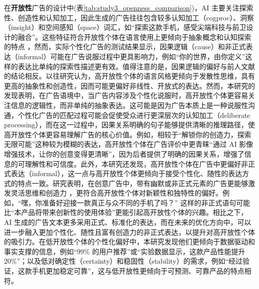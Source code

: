 在\textbf{开放性}广告的设计中(表\ref{tab:study3_openness_comparison})，AI 主要关注探索性、创造性和认知加工，因此生成的广告往往包含较多认知加工（cogproc）、洞察（insight）和空间感知（space）词汇，如“探索这款手机，感受尖端科技与前卫设计的融合”。这些特征符合开放性个体在语言使用上更倾向于抽象概念和认知探索的特点 \citep{deyoung2014openness}，然而，实际个性化广告的测试结果显示，因果逻辑（cause）和非正式表达（informal）可能在广告说服过程中更具影响力，例如“你的世界，由你定义”这样的表达比单纯的探索性描述更有效。值得注意的是，因果逻辑的偏好与前人文献的结论相反\citep{pennebaker1999linguistic}。以往研究认为，高开放性个体的语言风格更倾向于发散性思维，具有更高的抽象性和创造性，因而可能更偏好非线性、开放式的表达。然而，本研究的发现表明，在广告语境中，当广告内容涉及个性化说服时，高开放性个体更容易关注信息的逻辑性，而非单纯的抽象表达。这可能是因为广告本质上是一种说服性沟通，个性化广告的匹配过程可能会促使受众进行更深层次的认知加工（deliberate processing），而在这一过程中，因果关系明确的句子能够提供清晰的推理路径，使高开放性个体更容易理解广告的核心价值。例如，相较于“解锁你的创造力，探索无限可能”这种较为模糊的表达，高开放性个体在广告评价中更青睐“通过 AI 影像增强技术，让你的创意变得更清晰”，因为后者提供了明确的因果关系，增强了信息的可理解性和可信度。此外，本研究还发现，高开放性个体在广告中更偏好非正式表达（informal），这一点与高开放性个体更倾向于接受个性化、随性的表达方式的特点一致。研究表明，在创意广告中，带有幽默或非正式元素的广告更能够激发灵活思维和创造力 \citep{kover1995creativity}，更符合高开放性个体对新颖性和独特性的偏好。例如，“嘿，你准备好迎接一款真正与众不同的手机了吗？” 这样的非正式语句可能比“本产品将带来创新性的使用体验”更能引起高开放性个体的兴趣。相比之下，AI 生成的广告文本更多采用正式、标准化的表达，而在未来的优化方向中，可以进一步融入更加个性化、随性且富有创造力的非正式表达，以提升对高开放性个体的吸引力。在低开放性个体的个性化偏好中，本研究发现他们更倾向于数据驱动和事实支撑的信息，例如“99\% 的用户推荐”或“实验数据显示，这款产品性能提升 20\%”；以及低对确定性（certainty）和稳固性（stability）的需求，例如“经过验证，这款手机更加稳定可靠”，这与低开放性更倾向于可预测、可靠产品的特点相符。


